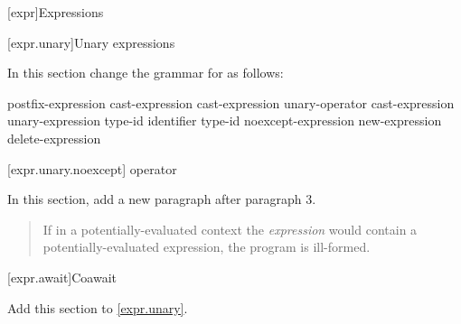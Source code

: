 

\setcounter{chapter}{4}
[expr]{Expressions}

\setcounter{section}{2}
[expr.unary]{Unary expressions}


In this section change the grammar for  as follows:

\begin{bnf}
	\br
	postfix-expression\br
	\terminal{++} cast-expression\br
	\terminal{-{-}} cast-expression\br
	\br
	unary-operator cast-expression\br
	 unary-expression\br
	 type-id \terminal{)}\br
	 \terminal{(} identifier \terminal{)}\br
	 type-id \terminal{)}\br
	noexcept-expression\br
	new-expression\br
	delete-expression\br
\end{bnf}

\setcounter{subsection}{6}
[expr.unary.noexcept]{ operator}


In this section, add a new paragraph after paragraph 3.

\begin{quote}
\setcounter{Paras}{3}
\pnum
If in a potentially-evaluated context the \textit{expression} would contain a potentially-evaluated  expression, the program is ill-formed.
\end{quote}

\setcounter{subsection}{8}
[expr.await]{Coawait}

Add this section to \ref{expr.unary}.

